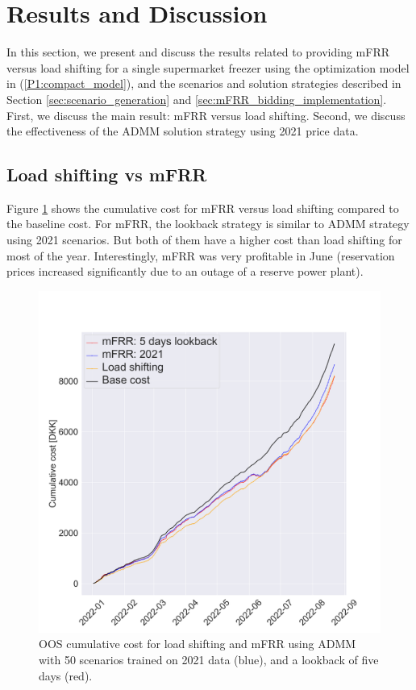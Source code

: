 
\section{Results and Discussion}\label{sec:results}

In this section, we present and discuss the results related to providing mFRR versus load shifting for a single supermarket freezer using the optimization model in (\ref{P1:compact_model}), and the scenarios and solution strategies described in Section \ref{sec:scenario_generation} and \ref{sec:mFRR_bidding_implementation}. First, we discuss the main result: mFRR versus load shifting. Second, we discuss the effectiveness of the ADMM solution strategy using 2021 price data.

\subsection{Load shifting vs mFRR}

Figure \ref{fig:cumulative_cost_comparison} shows the cumulative cost for mFRR versus load shifting compared to the baseline cost. For mFRR, the lookback strategy is similar to ADMM strategy using 2021 scenarios. But both of them have a higher cost than load shifting for most of the year. Interestingly, mFRR was very profitable in June (reservation prices increased significantly due to an outage of a reserve power plant).

\begin{figure}[!t]
    \centering
    \includegraphics[width=\columnwidth]{../figures/cumulative_cost_comparison.png}
    \caption{OOS cumulative cost for load shifting and mFRR using ADMM with 50 scenarios trained on 2021 data (blue), and a lookback of five days (red).}
    \label{fig:cumulative_cost_comparison}
\end{figure}

